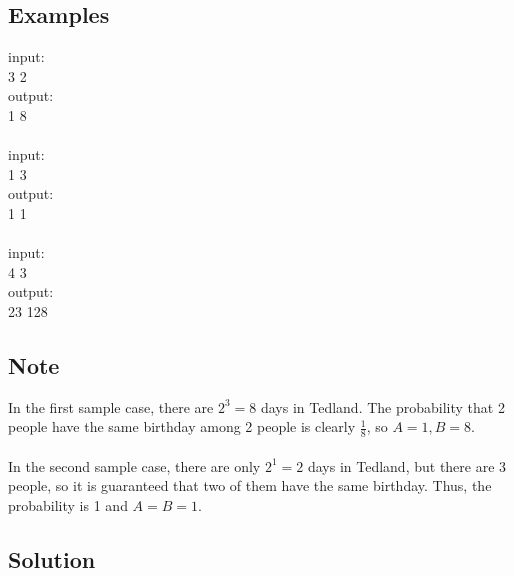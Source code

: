 \documentclass[10pt,a4paper]{article}
\begin{document}
\subsection*{Examples}
input: \\
3 2 \\
output: \\
1 8 \\
\\
input: \\
1 3 \\
output: \\
1 1 \\
\\
input: \\
4 3 \\
output: \\
23 128 

\subsection*{Note}
In the first sample case, there are $2^3=8$ days in Tedland. The probability that 2 people have the same birthday among 2 people is clearly $\frac{1}{8}$, so $A=1, B=8$.
\\ \\
In the second sample case, there are only $2^1=2$ days in Tedland, but there are 3 people, so it is guaranteed that two of them have the same birthday. Thus, the probability is 1 and $A=B=1$.

\subsection*{Solution}
\end{document}
